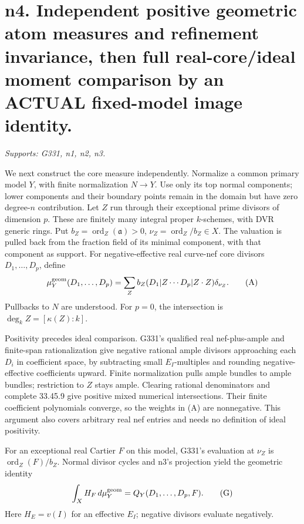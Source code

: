 \documentclass[11pt]{article}
\begin{document}
\section{n4. Independent positive geometric atom measures and refinement invariance, then full real-core/ideal moment comparison by an ACTUAL fixed-model image identity.}
\textit{Supports: G331, n1, n2, n3.}

We next construct the core measure independently. Normalize a common primary model \(Y\), with finite normalization \(N\to Y\). Use only its top normal components; lower components and their boundary points remain in the domain but have zero degree-\(n\) contribution. Let \(Z\) run through their exceptional prime divisors of dimension \(p\). These are finitely many integral proper \(k\)-schemes, with DVR generic rings. Put \(b_Z=\operatorname{ord}_Z(\mathfrak a)>0\), \(\nu_Z=\operatorname{ord}_Z/b_Z\in X\). The valuation is pulled back from the fraction field of its minimal component, with that component as support. For negative-effective real curve-nef core divisors \(D_1,\ldots,D_p\), define
\[
\mu_Y^{\rm geom}(D_1,\ldots,D_p)
=\sum_Z b_Z(D_1|Z\cdots D_p|Z\cdot Z)\delta_{\nu_Z}. \tag{A}
\]
Pullbacks to \(N\) are understood. For \(p=0\), the intersection is \(\deg_k Z=[\kappa(Z):k]\).

Positivity precedes ideal comparison. G331's qualified real nef-plus-ample and finite-span rationalization give negative rational ample divisors approaching each \(D_i\) in coefficient space, by subtracting small \(E_I\)-multiples and rounding negative-effective coefficients upward. Finite normalization pulls ample bundles to ample bundles; restriction to \(Z\) stays ample. Clearing rational denominators and complete 33.45.9 give positive mixed numerical intersections. Their finite coefficient polynomials converge, so the weights in (A) are nonnegative. This argument also covers arbitrary real nef entries and needs no definition of ideal positivity.

For an exceptional real Cartier \(F\) on this model, G331's evaluation at \(\nu_Z\) is \(\operatorname{ord}_Z(F)/b_Z\). Normal divisor cycles and n3's projection yield the geometric identity
\[
\int_X H_F\,d\mu_Y^{\rm geom}=Q_Y(D_1,\ldots,D_p,F). \tag{G}
\]
Here \(H_E=v(I)\) for an effective \(E_I\); negative divisors evaluate negatively.
\end{document}
